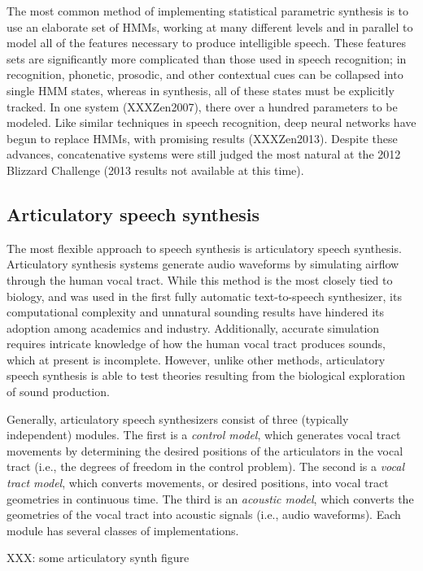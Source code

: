 \documentclass{article}
\begin{document}
The most common method of implementing
statistical parametric synthesis
is to use an elaborate set of HMMs,
working at many different levels
and in parallel to model
all of the features necessary to produce
intelligible speech.
These features sets are significantly
more complicated than those
used in speech recognition;
in recognition, phonetic, prosodic,
and other contextual cues
can be collapsed into single HMM states,
whereas in synthesis,
all of these states must be explicitly tracked.
In one system (XXXZen2007),
there over a hundred parameters to be modeled.
Like similar techniques in speech recognition,
deep neural networks have begun
to replace HMMs, with promising results (XXXZen2013).
Despite these advances, concatenative systems
were still judged the most natural
at the 2012 Blizzard Challenge
(2013 results not available at this time).

\subsection{Articulatory speech synthesis}

The most flexible approach to speech synthesis
is articulatory speech synthesis.
Articulatory synthesis systems generate
audio waveforms by simulating
airflow through the human vocal tract.
While this method is
the most closely tied to biology,
and was used in the first fully automatic
text-to-speech synthesizer,
its computational complexity
and unnatural sounding results
have hindered its adoption
among academics and industry.
Additionally, accurate simulation
requires intricate knowledge
of how the human vocal tract
produces sounds,
which at present is incomplete.
However, unlike other methods,
articulatory speech synthesis
is able to test theories
resulting from the biological exploration
of sound production.

Generally, articulatory speech synthesizers
consist of three (typically independent) modules.
The first is a \textit{control model},
which generates vocal tract movements
by determining the desired positions
of the articulators in the vocal tract
(i.e., the degrees of freedom in the control problem).
The second is a \textit{vocal tract model},
which converts movements, or desired positions,
into vocal tract geometries in continuous time.
The third is an \textit{acoustic model},
which converts the geometries of the vocal tract
into acoustic signals (i.e., audio waveforms).
Each module has several classes of implementations.

XXX: some articulatory synth figure
\end{document}
